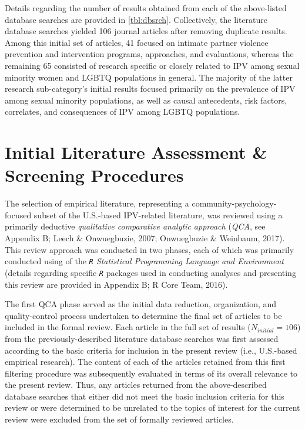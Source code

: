 \documentclass[11pt,]{tufte-book}
\begin{document}
Details regarding the number of results obtained from each of the
above-listed database searches are provided in
\cref{tbl:dbsrch}. Collectively, the literature database
searches yielded 106 journal articles after removing duplicate results.
Among this initial set of articles, 41 focused on intimate partner
violence prevention and intervention programs, approaches, and
evaluations, whereas the remaining 65 consisted of research specific or
closely related to IPV among sexual minority women and LGBTQ populations
in general. The majority of the latter research sub-category's initial
results focused primarily on the prevalence of IPV among sexual minority
populations, as well as causal antecedents, risk factors, correlates,
and consequences of IPV among LGBTQ populations.

\section{Initial Literature Assessment \& Screening
Procedures}\label{initial-literature-assessment-screening-procedures}

The selection of empirical literature, representing a
community-psychology-focused subset of the U.S.-based IPV-related
literature, was reviewed using a primarily deductive \emph{qualitative
comparative analytic approach} (\emph{QCA}, see Appendix B; Leech \&
Onwuegbuzie, 2007; Onwuegbuzie \& Weinbaum, 2017). This review approach
was conducted in two phases, each of which was primarily conducted using
of the \emph{\texttt{R} Statistical Programming Language and
Environment} (details regarding specific \emph{\texttt{R}} packages used
in conducting analyses and presenting this review are provided in
Appendix B; R Core Team, 2016).

The first QCA phase served as the initial data reduction, organization,
and quality-control process undertaken to determine the final set of
articles to be included in the formal review. Each article in the full
set of results (\(N_{initial} = 106\)) from the previously-described
literature database searches was first assessed according to the basic
criteria for inclusion in the present review (i.e., U.S.-based empirical
research). The content of each of the articles retained from this first
filtering procedure was subsequently evaluated in terms of its overall
relevance to the present review. Thus, any articles returned from the
above-described database searches that either did not meet the basic
inclusion criteria for this review or were determined to be unrelated to
the topics of interest for the current review were excluded from the set
of formally reviewed articles.
\end{document}

